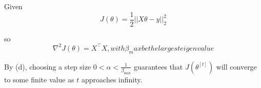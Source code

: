 \begin{answer}

Given
\begin{equation*}
	J(\theta) = \frac{1}{2}||X\theta - y||_2^2
\end{equation*}

so 
\begin{equation*}
	\nabla^2J(\theta) = X^\top X, with \beta_max be the largest eigenvalue 
\end{equation*}

By (d), choosing a step size $0 < \alpha < \frac{1}{\beta_{\max}}$ guarantees that $J(\theta^{[t]})$ will converge to some finite value as $t$ approaches infinity.
\end{answer}

